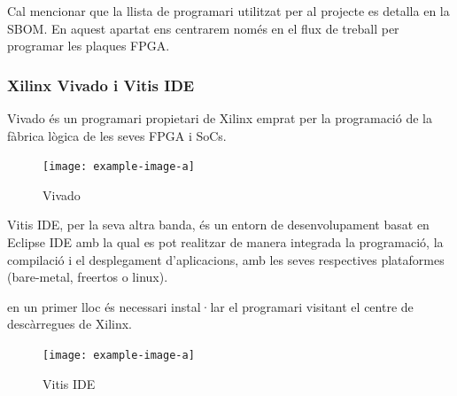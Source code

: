 Cal mencionar que la llista de programari utilitzat per al projecte es
detalla en la SBOM. En aquest apartat ens centrarem només en el flux de
treball per programar les plaques FPGA.

\subsubsection{ Xilinx Vivado i Vitis IDE }
{ 
    Vivado és un programari propietari de Xilinx emprat per la programació de
    la fàbrica lògica de les seves FPGA i SoCs.

    \begin{figure}[ht]
        \centering
        \captionsetup{justification=centering,margin=1.5cm}
        \texttt{[image: example-image-a]}
        \caption{ Vivado }
    \end{figure}

    Vitis IDE, per la seva altra banda, és un entorn de desenvolupament
    basat en Eclipse IDE amb la qual es pot realitzar de manera integrada
    la programació, la compilació i el desplegament d'aplicacions, amb les
    seves respectives plataformes (bare-metal, freertos o linux).

    en un primer lloc és necessari instal·lar el programari visitant el
    centre de descàrregues de Xilinx\footnotemark.


    \begin{figure}[ht]
        \centering
        \captionsetup{justification=centering,margin=1.5cm}
        \texttt{[image: example-image-a]}
        \caption{ Vitis IDE }
    \end{figure}
}

